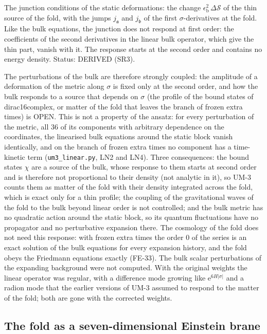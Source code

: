 \documentclass[
  10pt,
]{article}
\begin{document}
The junction conditions of the static deformations: the change
\(\epsilon_{\mathrm{b}}^2\,\Delta\mathcal{S}\) of the thin source of the
fold, with the jumps \(j_{\mathfrak{a}}\) and \(j_{\mathfrak{b}}\) of
the first \(\sigma\)-derivatives at the fold. Like the bulk equations,
the junction does not respond at first order: the coefficients of the
second derivatives in the linear bulk operator, which give the thin
part, vanish with it. The response starts at the second order and
contains no energy density. Status: DERIVED (SR3).

The perturbations of the bulk are therefore strongly coupled: the
amplitude of a deformation of the metric along \(\sigma\) is fixed only
at the second order, and how the bulk responds to a source that depends
on \(\sigma\) (the profile of the bound states of dirac16complex, or
matter of the fold that leaves the branch of frozen extra times) is
OPEN. This is not a property of the ansatz: for every perturbation of
the metric, all 36 of its components with arbitrary dependence on the
coordinates, the linearised bulk equations around the static block
vanish identically, and on the branch of frozen extra times no component
has a time-kinetic term (\texttt{um3\_linear.py}, LN2 and LN4). Three
consequences: the bound states \(\chi\) are a source of the bulk, whose
response to them starts at second order and is therefore not
proportional to their density (not analytic in it), so UM-3 counts them
as matter of the fold with their density integrated across the fold,
which is exact only for a thin profile; the coupling of the
gravitational waves of the fold to the bulk beyond linear order is not
controlled; and the bulk metric has no quadratic action around the
static block, so its quantum fluctuations have no propagator and no
perturbative expansion there. The cosmology of the fold does not need
this response: with frozen extra times the order 0 of the series is an
exact solution of the bulk equations for every expansion history, and
the fold obeys the Friedmann equations exactly (FE-33). The bulk scalar
perturbations of the expanding background were not computed. With the
original weights the linear operator was regular, with a difference mode
growing like \(\mathrm{e}^{6H\lvert\sigma\rvert}\) and a radion mode
that the earlier versions of UM-3 assumed to respond to the matter of
the fold; both are gone with the corrected weights.

\hypertarget{the-fold-as-a-seven-dimensional-einstein-brane}{%
\subsection{The fold as a seven-dimensional Einstein
brane}\label{the-fold-as-a-seven-dimensional-einstein-brane}}
\end{document}
